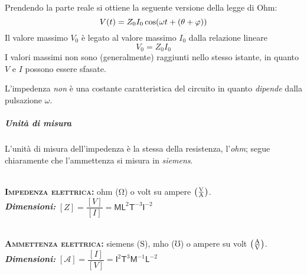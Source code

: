 Prendendo la parte reale si ottiene la seguente versione della legge di Ohm:
\begin{equation}
	V(t)=Z_0I_0\cos(\omega t+(\theta+\oldphi))
\end{equation}
Il valore massimo $V_0$ è legato al valore massimo $I_0$ dalla relazione lineare
\begin{equation}
	V_0=Z_0I_0
\end{equation}
	I valori massimi non sono (generalmente) raggiunti nello stesso istante, in quanto $V$ e $I$ possono essere sfasate.
\begin{observe}
	L'impedenza \textit{non} è una costante caratteristica del circuito in quanto \textit{dipende} dalla pulsazione $\omega$.
\end{observe}
\subparagraph{Unità di misura}
L'unità di misura dell'impedenza è la stessa della resistenza, l'\textit{ohm}; segue chiaramente che l'ammettenza si misura in \textit{siemens}.
\begin{units}~\\
	\textbf{\textsc{Impedenza elettrica:}} ohm ($\unit{\ohm}$) o volt su ampere $\left(\unit[per-mode = fraction]{\volt\per\ampere}\right)$.\\
	\textit{\textbf{Dimensioni:}} $[Z]=\dfrac{[V]}{[I]}=\mathsf{M} \mathsf{L}^2  \mathsf{T}^{-3}\mathsf{I}^{-2}$
\end{units}
\begin{units}~\\
	\textbf{\textsc{Ammettenza elettrica:}} siemens ($\unit{\siemens}$), mho  ($\mho$) o ampere su volt $\left(\unit[per-mode = fraction]{\ampere\per\volt}\right)$.\\
	\textit{\textbf{Dimensioni:}} $[\mathcal{A}]=\dfrac{[I]}{[V]}=\mathsf{I}^{2}\mathsf{T}^{3}\mathsf{M}^{-1} \mathsf{L}^{-2}$
\end{units}
